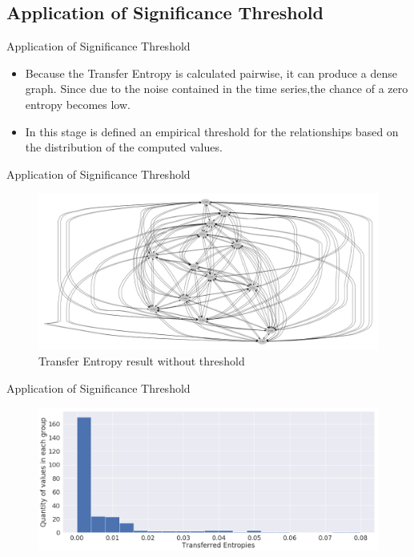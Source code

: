 \subsection{Application of Significance Threshold}
\begin{frame}{Application of Significance Threshold}
    \begin{itemize}
        \item { Because the Transfer Entropy is calculated pairwise, it can produce a dense graph. Since due to the noise contained in the time series,the chance of a zero entropy becomes low.
        }
        \item {In this stage is defined an empirical threshold for the relationships based on the distribution of the computed values.}
    \end{itemize}
\end{frame}

\begin{frame}{Application of Significance Threshold}
   \begin{figure}
                \centering
                \includegraphics[width=\textwidth]{figuras/dot_graph.pdf}
                \caption{Transfer Entropy result without threshold}
                \label{fig:my_label}
            \end{figure}
\end{frame}

\begin{frame}{Application of Significance Threshold}
    \begin{figure}
        \includegraphics[width=\textwidth]{figuras/hist_ex.png}
    \end{figure}
\end{frame}

